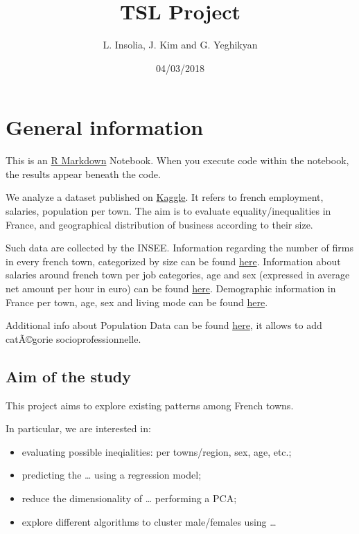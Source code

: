 \documentclass[]{article}
\title{TSL Project}
\author{L. Insolia, J. Kim and G. Yeghikyan}
\date{04/03/2018}
\providecommand{\tightlist}{%
  \setlength{\itemsep}{0pt}\setlength{\parskip}{0pt}}
\begin{document}
\maketitle

{
\setcounter{tocdepth}{3}
\tableofcontents
}
\section{General information}\label{general-information}

This is an \href{http://rmarkdown.rstudio.com}{R Markdown} Notebook.
When you execute code within the notebook, the results appear beneath
the code.

We analyze a dataset published on
\href{https://www.kaggle.com/etiennelq/french-employment-by-town}{Kaggle}.
It refers to french employment, salaries, population per town. The aim
is to evaluate equality/inequalities in France, and geographical
distribution of business according to their size.

Such data are collected by the INSEE. Information regarding the number
of firms in every french town, categorized by size can be found
\href{https://www.insee.fr/fr/metadonnees/definition/c1135}{here}.
Information about salaries around french town per job categories, age
and sex (expressed in average net amount per hour in euro) can be found
\href{https://www.insee.fr/fr/statistiques/2522515}{here}. Demographic
information in France per town, age, sex and living mode can be found
\href{https://www.insee.fr/fr/statistiques/2863607}{here}.

Additional info about Population Data can be found
\href{https://www.insee.fr/fr/statistiques/2863607\#dictionnaire}{here},
it allows to add catÃ©gorie socioprofessionnelle.

\subsection{Aim of the study}\label{aim-of-the-study}

This project aims to explore existing patterns among French towns.

In particular, we are interested in:

\begin{itemize}
\tightlist
\item
  evaluating possible ineqialities: per towns/region, sex, age, etc.;
\item
  predicting the \ldots{} using a regression model;
\item
  reduce the dimensionality of \ldots{} performing a PCA;
\item
  explore different algorithms to cluster male/females using \ldots{}
\end{itemize}
\end{document}
